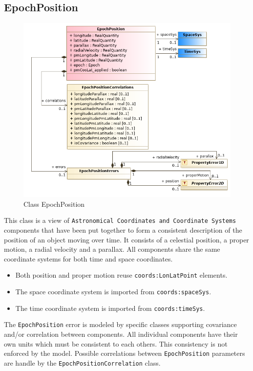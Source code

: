   \subsection{EpochPosition}

      \begin{figure}[h]
        \includegraphics[width=1.0\textwidth]{../model/EpochPosition.png}
        \caption{Class EpochPosition}
        \label{fig:EpochPosition}
      \end{figure}

    
  \label{sect:EpochPosition}
    This class is a view of \texttt{Astronomical Coordinates and Coordinate Systems} \citep{2022ivoa.specQ1004R} components that have been put together to form a consistent description of the position of an object moving over time. It consists of a celestial position, a proper motion, a radial velocity and a parallax. All components share the same coordinate systems for both time and space coordinates. \begin{itemize} \item Both position and proper motion reuse \texttt{coords:LonLatPoint} elements. \item The space coordinate system is imported from \texttt{coords:spaceSys}. \item The time coordinate system is imported from \texttt{coords:timeSys}. \end{itemize} The \texttt{EpochPosition} error is modeled by specific classes supporting covariance and/or correlation between components. All individual components have their own units which must be consistent to each others. This consistency is not enforced by the model. Possible correlations between \texttt{EpochPosition} parameters are handle by the \texttt{EpochPositionCorrelation} class.

